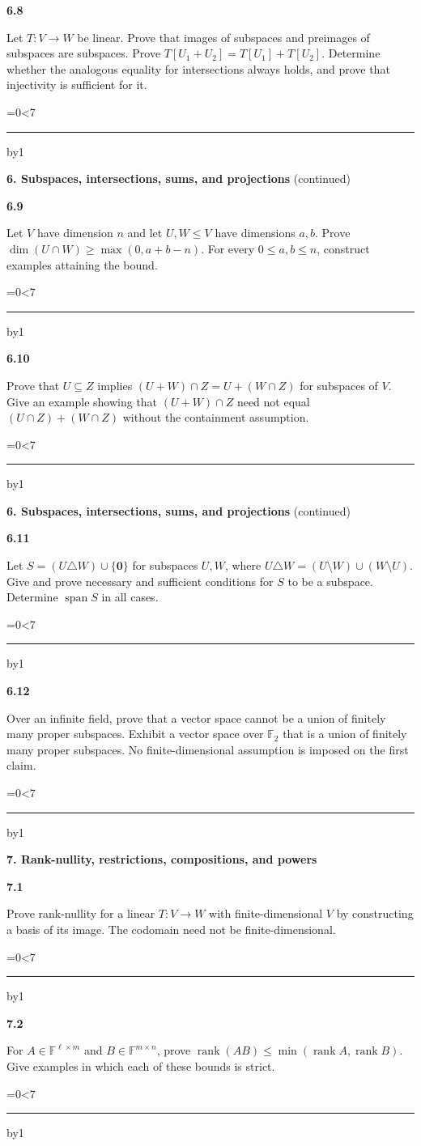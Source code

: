 \documentclass[11pt,letterpaper]{article}
\newcommand{\topicshort}{Problem collection}
\newcommand{\F}{\mathbb F}\newcommand{\R}{\mathbb R}\newcommand{\Q}{\mathbb Q}\newcommand{\C}{\mathbb C}\newcommand{\Z}{\mathbb Z}
\newcommand{\spn}{\operatorname{span}}\newcommand{\rk}{\operatorname{rank}}\newcommand{\tr}{\operatorname{tr}}\newcommand{\id}{\operatorname{id}}\newcommand{\rref}{\operatorname{rref}}
\newcommand{\ruled}[1]{\par\begingroup\parskip=0pt\baselineskip=17pt\count255=0\loop\ifnum\count255<#1\noindent\textcolor{black!17}{\rule{\linewidth}{.25pt}}\par\advance\count255 by1\repeat\endgroup}
\newcommand{\problem}[4]{\noindent\begin{minipage}[t][3.48in][t]{\linewidth}\textbf{\color{navy}#1}\quad{\small\sffamily\color{teal}#2#3}\par #4\par\vfill\ruled{7}\end{minipage}}
\begin{document}
\problem{6.8}{M}{}{Let $T:V\to W$ be linear. Prove that images of subspaces and preimages of subspaces are subspaces. Prove $T[U_1+U_2]=T[U_1]+T[U_2]$. Determine whether the analogous equality for intersections always holds, and prove that injectivity is sufficient for it.}
\newpage
\renewcommand{\topicshort}{Subspaces and sums}
{\large\bfseries\color{navy}6. Subspaces, intersections, sums, and projections} {\small(continued)}\par\vspace{9pt}
\problem{6.9}{M}{}{Let $V$ have dimension $n$ and let $U,W\le V$ have dimensions $a,b$. Prove $\dim(U\cap W)\ge\max(0,a+b-n)$. For every $0\le a,b\le n$, construct examples attaining the bound.}
\par\vspace{14pt}
\problem{6.10}{M}{}{Prove that $U\subseteq Z$ implies $(U+W)\cap Z=U+(W\cap Z)$ for subspaces of $V$. Give an example showing that $(U+W)\cap Z$ need not equal $(U\cap Z)+(W\cap Z)$ without the containment assumption.}
\newpage
\renewcommand{\topicshort}{Subspaces and sums}
{\large\bfseries\color{navy}6. Subspaces, intersections, sums, and projections} {\small(continued)}\par\vspace{9pt}
\problem{6.11}{C}{}{Let $S=(U\triangle W)\cup\{\mathbf0\}$ for subspaces $U,W$, where $U\triangle W=(U\setminus W)\cup(W\setminus U)$. Give and prove necessary and sufficient conditions for $S$ to be a subspace. Determine $\spn S$ in all cases.}
\par\vspace{14pt}
\problem{6.12}{C}{}{Over an infinite field, prove that a vector space cannot be a union of finitely many proper subspaces. Exhibit a vector space over $\F_2$ that is a union of finitely many proper subspaces. No finite-dimensional assumption is imposed on the first claim.}
\newpage
\renewcommand{\topicshort}{Rank and powers}
{\large\bfseries\color{navy}7. Rank-nullity, restrictions, compositions, and powers}\par\vspace{9pt}
\problem{7.1}{W}{ / $\star$}{Prove rank-nullity for a linear $T:V\to W$ with finite-dimensional $V$ by constructing a basis of its image. The codomain need not be finite-dimensional.}
\par\vspace{14pt}
\problem{7.2}{W}{ / $\star$}{For $A\in\F^{\ell\times m}$ and $B\in\F^{m\times n}$, prove $\rk(AB)\le\min(\rk A,\rk B)$. Give examples in which each of these bounds is strict.}
\end{document}
